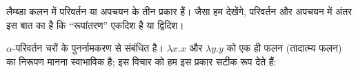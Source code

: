 \documentclass[../../../include/open-logic-section]{subfiles}
\begin{document}

लैम्ब्डा कलन में परिवर्तन या अपचयन के तीन प्रकार हैं। जैसा हम देखेंगे,
परिवर्तन और अपचयन में अंतर इस बात का है कि ``रूपांतरण'' एकदिश है या
द्विदिश।

$\alpha$-परिवर्तन चरों के पुनर्नामकरण से संबंधित है। $\lambda x. x$ और
$\lambda y.y$ को एक ही फलन (तादात्म्य फलन) का निरूपण मानना स्वाभाविक है;
इस विचार को हम इस प्रकार सटीक रूप देते हैं:
\end{document}
